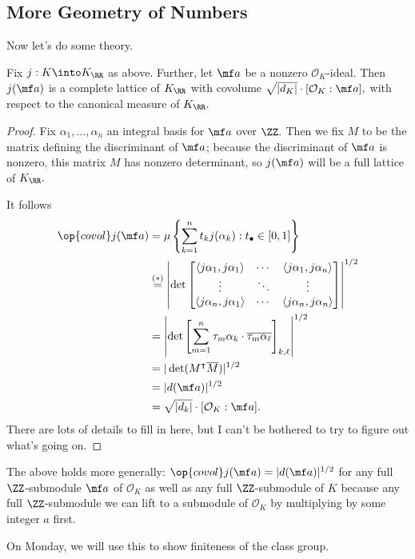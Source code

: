 \subsection{More Geometry of Numbers}
Now let's do some theory.
\begin{proposition}
    Fix $j:K\into K_\RR$ as above. Further, let $\mf a$ be a nonzero $\mathcal O_K$-ideal. Then $j(\mf a)$ is a complete lattice of $K_\RR$ with covolume $\sqrt{|d_K|}\cdot[\mathcal O_K:\mf a],$ with respect to the canonical measure of $K_\RR.$
\end{proposition}
\begin{proof}
    Fix $\alpha_1,\ldots,\alpha_n$ an integral basis for $\mf a$ over $\ZZ.$ Then we fix $M$ to be the matrix defining the discriminant of $\mf a$; because the discriminant of $\mf a$ is nonzero, this matrix $M$ has nonzero determinant, so $j(\mf a)$ will be a full lattice of $K_\RR.$

    It follows
    \begin{align*}
        \op{covol}j(\mf a) &= \mu\left\{\sum_{k=1}^n t_k j(\alpha_k):t_\bullet\in[0,1]\right\} \\
        &\stackrel{(*)}=\left|\det\begin{bmatrix}
            \langle j\alpha_1,j\alpha_1\rangle & \cdots & \langle j\alpha_1,j\alpha_n\rangle \\
            \vdots & \ddots & \vdots \\
            \langle j\alpha_n,j\alpha_1\rangle & \cdots & \langle j\alpha_n,j\alpha_n\rangle
        \end{bmatrix}\right|^{1/2} \\
        &= \left|\det\left[\sum_{m=1}^n\tau_m\alpha_k\cdot\overline{\tau_m\alpha_\ell}\right]_{k,\ell}\right|^{1/2} \\
        &= |\det(M^\intercal \overline M)|^{1/2} \\
        &= |d(\mf a)|^{1/2} \\
        &= \sqrt{|d_k|}\cdot[\mathcal O_K:\mf a].
    \end{align*}
    There are lots of details to fill in here, but I can't be bothered to try to figure out what's going on.
\end{proof}
\begin{remark}
    The above holds more generally: $\op{covol}j(\mf a)=|d(\mf a)|^{1/2}$ for any full $\ZZ$-submodule $\mf a$ of $\mathcal O_K$ as well as any full $\ZZ$-submodule of $K$ because any full $\ZZ$-submodule we can lift to a submodule of $\mathcal O_K$ by multiplying by some integer $a$ first.
\end{remark}
On Monday, we will use this to show finiteness of the class group.